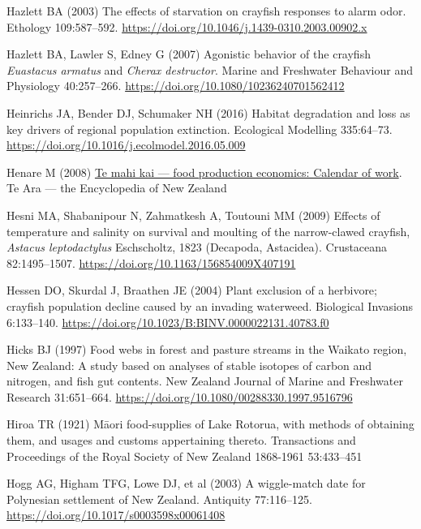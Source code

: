 \documentclass[
  12pt,
  a4paper,
  oneside]{scrbook}
\newlength{\cslhangindent}
\newenvironment{CSLReferences}[2] %
 {\begin{list}{}{%
  \setlength{\itemindent}{0pt}
  \setlength{\leftmargin}{0pt}
  \setlength{\parsep}{0pt}
  \ifodd #1
   \setlength{\leftmargin}{\cslhangindent}
   \setlength{\itemindent}{-1\cslhangindent}
  \fi
  \setlength{\itemsep}{#2\baselineskip}}}
 {\end{list}}
\begin{document}
\begin{CSLReferences}{1}{1}
Hazlett BA (2003) The effects of starvation on crayfish responses to
alarm odor. Ethology 109:587--592.
\url{https://doi.org/10.1046/j.1439-0310.2003.00902.x}

Hazlett BA, Lawler S, Edney G (2007) Agonistic behavior of the crayfish
{\emph{Euastacus armatus}} and {\emph{Cherax destructor}}. Marine and
Freshwater Behaviour and Physiology 40:257--266.
\url{https://doi.org/10.1080/10236240701562412}

Heinrichs JA, Bender DJ, Schumaker NH (2016) Habitat degradation and
loss as key drivers of regional population extinction. Ecological
Modelling 335:64--73.
\url{https://doi.org/10.1016/j.ecolmodel.2016.05.009}

Henare M (2008)
\href{https://teara.govt.nz/en/interactive/20264/maori-harvesting-seasons}{Te
mahi kai --- food production economics: Calendar of work}. Te Ara ---
the Encyclopedia of {New Zealand}

Hesni MA, Shabanipour N, Zahmatkesh A, Toutouni MM (2009) Effects of
temperature and salinity on survival and moulting of the narrow-clawed
crayfish, {\emph{Astacus leptodactylus}} {Eschscholtz}, 1823
({Decapoda}, {Astacidea}). Crustaceana 82:1495--1507.
\url{https://doi.org/10.1163/156854009X407191}

Hessen DO, Skurdal J, Braathen JE (2004) Plant exclusion of a herbivore;
crayfish population decline caused by an invading waterweed. Biological
Invasions 6:133--140.
\url{https://doi.org/10.1023/B:BINV.0000022131.40783.f0}

Hicks BJ (1997) Food webs in forest and pasture streams in the {Waikato}
region, {New Zealand}: A study based on analyses of stable isotopes of
carbon and nitrogen, and fish gut contents. New Zealand Journal of
Marine and Freshwater Research 31:651--664.
\url{https://doi.org/10.1080/00288330.1997.9516796}

Hiroa TR (1921) M{ā}ori food-supplies of {Lake Rotorua}, with methods of
obtaining them, and usages and customs appertaining thereto.
Transactions and Proceedings of the Royal Society of New Zealand
1868-1961 53:433--451

Hogg AG, Higham TFG, Lowe DJ, et al (2003) A wiggle-match date for
{Polynesian} settlement of {New Zealand}. Antiquity 77:116--125.
\url{https://doi.org/10.1017/s0003598x00061408}


\end{CSLReferences}
\end{document}
